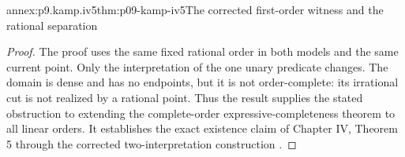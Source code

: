 \begin{annexitem}{annex:p9.kamp.iv5}{thm:p09-kamp-iv5}{The corrected first-order witness and the rational separation}
\begin{proof}
The proof uses the same fixed rational order in
both models and the same current point. Only
the interpretation of the one unary predicate
changes. The domain is dense and has no endpoints,
but it is not order-complete: its irrational cut
is not realized by a rational point. Thus the
result supplies the stated obstruction to extending
the complete-order expressive-completeness theorem
to all linear orders. It establishes the exact
existence claim of Chapter IV, Theorem 5 through
the corrected two-interpretation construction
\cite[ch.~IV, thm.~5, pp.~109--112]{Kamp1968}.
\end{proof}
\end{annexitem}
